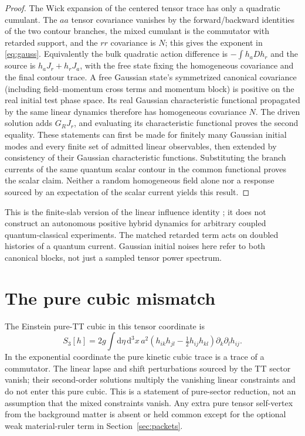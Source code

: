 \documentclass[11pt]{article}
\newcommand{\dd}{\mathrm{d}}
\begin{document}
\begin{proof}
The Wick expansion of the centered tensor trace has only a quadratic cumulant. The \(aa\) tensor covariance vanishes by the forward/backward identities of the two contour branches, the mixed cumulant is the commutator with retarded support, and the \(rr\) covariance is \(N\); this gives the exponent in \eqref{eq:gauss}. Equivalently the bulk quadratic action difference is \(-\int h_a D h_r\) and the source is \(h_aJ_r+h_rJ_a\), with the free state fixing the homogeneous covariance and the final contour trace. A free Gauss\-ian state's symmetrized canonical covariance (including field--momentum cross terms and momentum block) is positive on the real initial test phase space. Its real Gaussian characteristic functional propagated by the same linear dynamics therefore has homogeneous covariance \(N\). The driven solution adds \(G_R J_r\), and evaluating its characteristic functional proves the second equality. These statements can first be made for finitely many Gaussian initial modes and every finite set of admitted linear observables, then extended by consistency of their Gaussian characteristic functions. Substituting the branch currents of the same quantum scalar contour in the common functional proves the scalar claim. Neither a random homogeneous field alone nor a response sourced by an expectation of the scalar current yields this result.
\end{proof}

This is the finite-slab version of the linear influence identity \cite{FeynmanVernon}; it does not construct an autonomous positive hybrid dynamics for arbitrary coupled quantum-classical experiments. The matched retarded term acts on doubled histories of a quantum current. Gaussian initial noises here refer to both canonical blocks, not just a sampled tensor power spectrum.

\section{The pure cubic mismatch}\label{sec:cubic}
The Einstein pure-TT cubic in this tensor coordinate is \cite[Eq.~(37)]{Gao}
\begin{equation}
 S_3[h]=2g\int\dd\eta\,\dd^3x\,a^2
 \left(h_{ik}h_{jl}-\tfrac12h_{ij}h_{kl}\right)\partial_k\partial_l h_{ij}.
 \label{eq:EH3}
\end{equation}
In the exponential coordinate the pure kinetic cubic trace is a trace of a commutator. The linear lapse and shift perturbations sourced by the TT sector vanish; their second-order solutions multiply the vanishing linear constraints and do not enter this pure cubic. This is a statement of pure-sector reduction, not an assumption that the mixed constraints vanish. Any extra pure tensor self-vertex from the background matter is absent or held common except for the optional weak material-ruler term in Section~\ref{sec:packets}.
\end{document}
